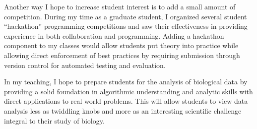 \documentclass[12pt]{article}
\begin{document}
Another way I hope to increase student interest is to add a small amount of competition. During my time as a graduate student, I organized several student ``hackathon'' programming competitions and saw their effectiveness in providing experience in both collaboration and programming. Adding a hackathon component to my classes would allow students put theory into practice while allowing direct enforcement of best practices by requiring submission through version control for automated testing and evaluation. 
 
In my teaching, I hope to prepare students for the analysis of biological data by providing a solid foundation in algorithmic understanding and analytic skills with direct applications to real world problems. This will allow students to view data analysis less as twiddling knobs and more as an interesting scientific challenge integral to their study of biology.
\end{document}
